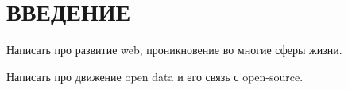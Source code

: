 \section*{ВВЕДЕНИЕ}

Написать про развитие web, проникновение во многие сферы жизни.

Написать про движение open data и его связь с open-source.
